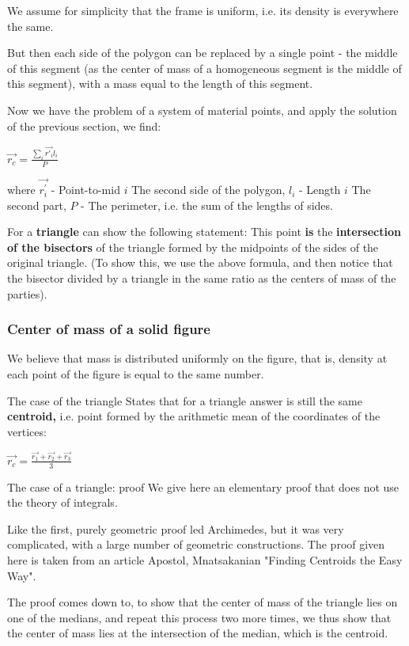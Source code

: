 We assume for simplicity that the frame is uniform, i.e. its density is everywhere the same.

But then each side of the polygon can be replaced by a single point - the middle of this segment (as the center of mass of a homogeneous segment is the middle of this segment), with a mass equal to the length of this segment.

Now we have the problem of a system of material points, and apply the solution of the previous section, we find:

$\vec{r_{c}}=\frac{\sum_{i}\vec{r'_{i}}l_{i}}{P}$

where $\vec {r_i ^ \prime}$ - Point-to-mid $i$ The second side of the polygon, $l_i$ - Length $i$ The second part, $P$ - The perimeter, i.e. the sum of the lengths of sides.

For a \textbf{triangle} can show the following statement: This point \textbf{is} the \textbf{intersection of the bisectors} of the triangle formed by the midpoints of the sides of the original triangle. (To show this, we use the above formula, and then notice that the bisector divided by a triangle in the same ratio as the centers of mass of the parties).

\subsubsection{ Center of mass of a solid figure }

We believe that mass is distributed uniformly on the figure, that is, density at each point of the figure is equal to the same number.

The case of the triangle
States that for a triangle answer is still the same \textbf{centroid,} i.e. point formed by the arithmetic mean of the coordinates of the vertices:

$\vec{r_{c}}=\frac{\vec{r_{1}}+\vec{r_{2}}+\vec{r_{3}}}{3}$

The case of a triangle: proof
We give here an elementary proof that does not use the theory of integrals.

Like the first, purely geometric proof led Archimedes, but it was very complicated, with a large number of geometric constructions. The proof given here is taken from an article Apostol, Mnatsakanian "Finding Centroids the Easy Way".

The proof comes down to, to show that the center of mass of the triangle lies on one of the medians, and repeat this process two more times, we thus show that the center of mass lies at the intersection of the median, which is the centroid.

